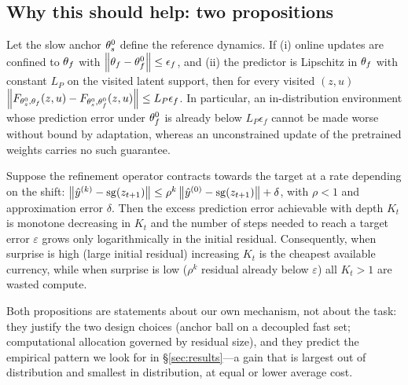 \subsection{Why this should help: two propositions}

\begin{proposition}
Let the slow anchor $\theta_s^0$ define the reference dynamics. If (i) online updates are confined
to $\theta_f$ with $\left\lVert \theta_f-\theta_f^0 \right\rVert\le\epsilon_f$, and (ii) the predictor is Lipschitz in $\theta_f$ with
constant $L_P$ on the visited latent support, then for every visited $(z,u)$
$\left\lVert F_{\theta_s^0,\theta_f}(z,u)-F_{\theta_s^0,\theta_f^0}(z,u) \right\rVert\le L_P\epsilon_f$. In particular, an
in-distribution environment whose prediction error under $\theta_f^0$ is already below
$L_P\epsilon_f$ cannot be made worse without bound by adaptation, whereas an unconstrained
update of the pretrained weights carries no such guarantee.
\end{proposition}

\begin{proposition}\label{prop:alloc}
Suppose the refinement operator contracts towards the target at a rate depending on the shift:
$\left\lVert \hat{y}^{(k)}-\mathrm{sg}(z_{t+1}) \right\rVert\le \rho^k\left\lVert \hat{y}^{(0)}-\mathrm{sg}(z_{t+1}) \right\rVert+\delta$, with
$\rho<1$ and approximation error $\delta$. Then the excess prediction error achievable with
depth $K_t$ is monotone decreasing in $K_t$ and the number of steps needed to reach a target
error $\varepsilon$ grows only logarithmically in the initial residual. Consequently, when
surprise is high (large initial residual) increasing $K_t$ is the cheapest available currency,
while when surprise is low ($\rho^k$ residual already below $\varepsilon$) all $K_t>1$ are
wasted compute.
\end{proposition}

Both propositions are statements about our own mechanism, not about the task: they justify the
two design choices (anchor ball on a decoupled fast set; computational allocation governed by
residual size), and they predict the empirical pattern we look for in \S\ref{sec:results}---a
gain that is largest out of distribution and smallest in distribution, at equal or lower
average cost.
